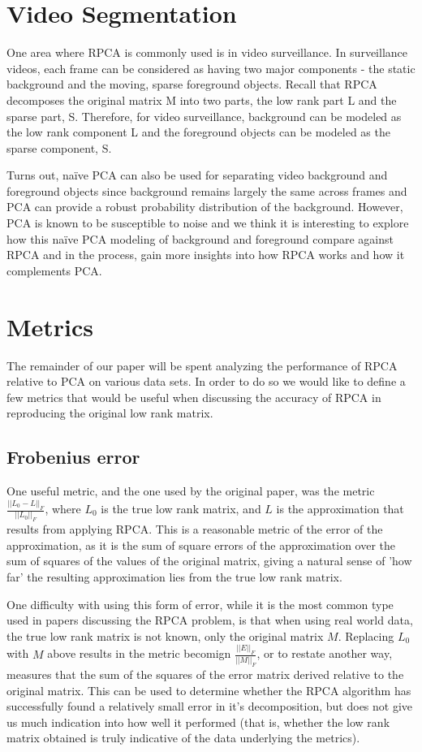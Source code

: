 \documentclass[11pt]{scrartcl} %
\theoremstyle{plain}
\begin{document}
\section{Video Segmentation}

One area where RPCA is commonly used is in video surveillance. In surveillance videos, each frame can be considered as having two major components - the static background and the moving, sparse foreground objects. Recall that RPCA decomposes the original matrix M into two parts, the low rank part L and the sparse part, S. Therefore, for video surveillance, background can be modeled as the low rank component L and the foreground objects can be modeled as the sparse component, S.

Turns out, naïve PCA can also be used for separating video background and foreground objects since background remains largely the same across frames and PCA can provide a robust probability distribution of the background. However, PCA is known to be susceptible to noise and we think it is interesting to explore how this naïve PCA modeling of background and foreground compare against RPCA and in the process, gain more insights into how RPCA works and how it complements PCA.

\section{Metrics}
The remainder of our paper will be spent analyzing the performance of RPCA relative to PCA on various data sets. In order to do so we would like to define a few metrics that would be useful when discussing the accuracy of RPCA in reproducing the original low rank matrix.

\subsection{Frobenius error}
One useful metric, and the one used by the original paper, was the metric $\frac{||L_0 - L||_F}{||L_0||_F}$, where $L_0$ is the true low rank matrix, and $L$ is the approximation that results from applying RPCA. This is a reasonable metric of the error of the approximation, as it is the sum of square errors of the approximation over the sum of squares of the values of the original matrix, giving a natural sense of 'how far' the resulting approximation lies from the true low rank matrix.

One difficulty with using this form of error, while it is the most common type used in papers discussing the RPCA problem, is that when using real world data, the true low rank matrix is not known, only the original matrix $M$. Replacing $L_0$ with $M$ above results in the metric becomign $\frac{||E||_F}{||M||_F}$, or to restate another way, measures that the sum of the squares of the error matrix derived relative to the original matrix. This can be used to determine whether the RPCA algorithm has successfully found a relatively small error in it's decomposition, but does not give us much indication into how well it performed (that is, whether the low rank matrix obtained is truly indicative of the data underlying the metrics).
\end{document}
